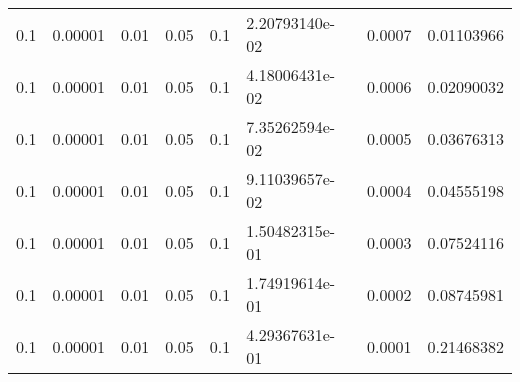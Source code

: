\begin{table}
\begin{tabular}{ccc}
          0.1 &         0.00001 &             0.01 &     0.05 &              0.1 &  2.20793140e-02 &           0.0007 &         0.01103966 \\
          0.1 &         0.00001 &             0.01 &     0.05 &              0.1 &  4.18006431e-02 &           0.0006 &         0.02090032 \\
          0.1 &         0.00001 &             0.01 &     0.05 &              0.1 &  7.35262594e-02 &           0.0005 &         0.03676313 \\
          0.1 &         0.00001 &             0.01 &     0.05 &              0.1 &  9.11039657e-02 &           0.0004 &         0.04555198 \\
          0.1 &         0.00001 &             0.01 &     0.05 &              0.1 &  1.50482315e-01 &           0.0003 &         0.07524116 \\
          0.1 &         0.00001 &             0.01 &     0.05 &              0.1 &  1.74919614e-01 &           0.0002 &         0.08745981 \\
          0.1 &         0.00001 &             0.01 &     0.05 &              0.1 &  4.29367631e-01 &           0.0001 &         0.21468382 \\
\end{tabular}
\end{table}
